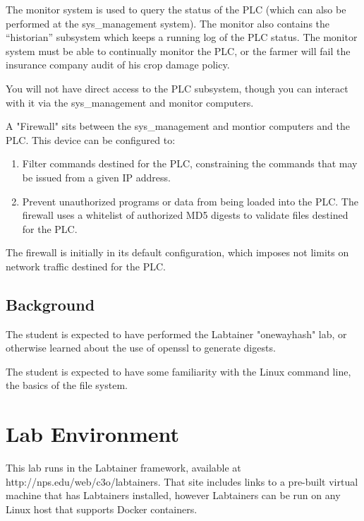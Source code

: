 The monitor system is used to query the status of the PLC (which can also be performed at the 
sys\_management system).  The monitor also contains the ``historian'' subsystem which keeps a running
log of the PLC status.  The monitor system must be able to continually monitor the PLC, or 
the farmer will fail the insurance company audit of his crop damage policy.

You will not have direct access to the PLC subsystem, 
though you can interact with it via the sys\_management and monitor computers.

A "Firewall" sits between the sys\_management and montior computers and the PLC.   
This device can be configured to:

\begin{enumerate}
\item Filter commands destined for the PLC, constraining the commands that may be issued from a given IP address.
\item Prevent unauthorized programs or data from being loaded into the PLC.   The firewall uses a whitelist of 
authorized MD5 digests to validate files destined for the PLC.
\end{enumerate}
The firewall is initially in its default configuration, which imposes not limits on network traffic destined
for the PLC.

\subsection {Background}
The student is expected 
to have performed the Labtainer "onewayhash" lab, or otherwise learned about 
the use of openssl to generate digests.

The student is expected to have some familiarity with the Linux command line,
the basics of the file system.

\section{Lab Environment}
This lab runs in the Labtainer framework,
available at http://nps.edu/web/c3o/labtainers.
That site includes links to a pre-built virtual machine
that has Labtainers installed, however Labtainers can
be run on any Linux host that supports Docker containers.

